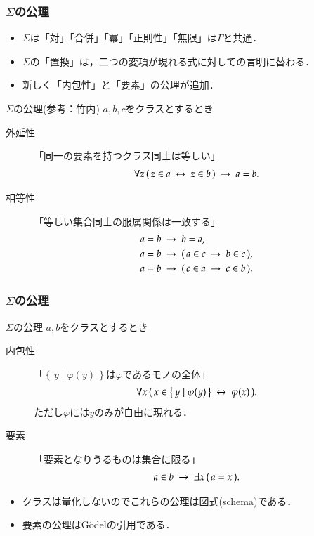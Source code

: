 \documentclass[dvipdfmx,10pt,notheorems]{beamer}
\theoremstyle{definition}
\newcommand{\Set}[2]{\left\{\, #1 \mid #2\, \right\}} %
\newcommand{\rarrow}{\hspace{0.25em}\rightarrow\hspace{0.25em}} %
\newcommand{\lrarrow}{\hspace{0.25em}\leftrightarrow\hspace{0.25em}} %
\begin{document}
\begin{frame}\frametitle{$\Sigma$の公理}
	\begin{itemize}
		\item $\Sigma$は「対」「合併」「冪」「正則性」「無限」は$\Gamma$と共通．
		\item $\Sigma$の「置換」は，二つの変項が現れる式に対しての言明に替わる．
		\item 新しく「内包性」と「要素」の公理が追加．
	\end{itemize}
	
	\begin{alertblock}{$\Sigma$の公理(参考：竹内\cite{TakeuchiSet})}
		$a,b,c$をクラスとするとき
		\begin{description}
			\item[外延性] 「同一の要素を持つクラス同士は等しい」
				\begin{align}
					\forall z\, (\, z \in a \lrarrow z \in b\, ) \rarrow a = b.
				\end{align}
			\item[相等性] 「等しい集合同士の服属関係は一致する」
				\begin{align}
					&a = b \rarrow b = a, \\
					&a = b \rarrow (\, a \in c \rarrow b \in c\, ), \\
					&a = b \rarrow (\, c \in a \rarrow c \in b\, ).
				\end{align}
		\end{description}	
	\end{alertblock}
\end{frame}

\begin{frame}\frametitle{$\Sigma$の公理}
	
	\begin{alertblock}{$\Sigma$の公理}
		$a,b$をクラスとするとき
		\begin{description}
			\item[内包性] 「$\Set{y}{\varphi(y)}$は$\varphi$であるモノの全体」
				\begin{align}
					\forall x\, (\, x \in \Set{y}{\varphi(y)} \lrarrow \varphi(x)\, ).
				\end{align}
				ただし$\varphi$には$y$のみが自由に現れる．
				
			\item[要素] 「要素となりうるものは集合に限る」
				\begin{align}
					a \in b \rarrow \exists x\, (\, a = x\, ).
				\end{align}
		\end{description}	
	\end{alertblock}
	
	\begin{itemize}	
		\item クラスは量化しないのでこれらの公理は図式(schema)である．	
		\item 要素の公理はG$\ddot{\mbox{o}}$del\cite{Godel}の引用である．
	\end{itemize}
\end{frame}
\end{document}

